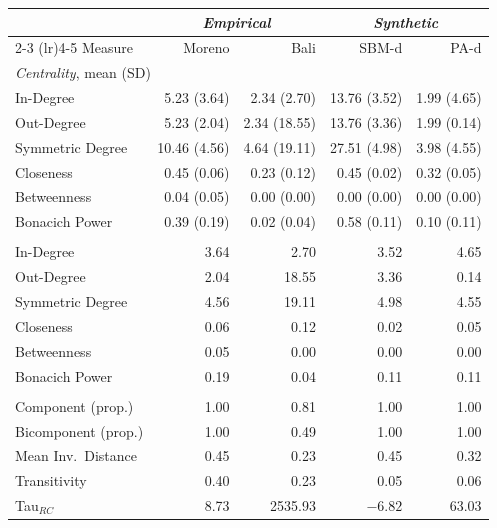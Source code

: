 \documentclass[11pt]{article}
\begin{document}
\begin{table}[!htbp]
\centering
\footnotesize
\setlength{\tabcolsep}{4pt}
\begin{tabular}{l r r | r r}
\toprule
& \multicolumn{2}{c|}{\textit{Empirical}} & \multicolumn{2}{c}{\textit{Synthetic}} \\
\cmidrule(lr){2-3} \cmidrule(lr){4-5}
Measure & Moreno & Bali & SBM-d & PA-d \\
\midrule
\multicolumn{5}{l}{\textit{Centrality}, mean (SD)} \\
In-Degree        & 5.23 (3.64)  & 2.34 (2.70)  & 13.76 (3.52) & 1.99 (4.65) \\
Out-Degree       & 5.23 (2.04)  & 2.34 (18.55) & 13.76 (3.36) & 1.99 (0.14) \\
Symmetric Degree & 10.46 (4.56) & 4.64 (19.11) & 27.51 (4.98) & 3.98 (4.55) \\
Closeness        & 0.45 (0.06)  & 0.23 (0.12)  & 0.45 (0.02)  & 0.32 (0.05) \\
Betweenness      & 0.04 (0.05)  & 0.00 (0.00)  & 0.00 (0.00)  & 0.00 (0.00) \\
Bonacich Power   & 0.39 (0.19)  & 0.02 (0.04)  & 0.58 (0.11)  & 0.10 (0.11) \\
\addlinespace
\multicolumn{5}{l}{\textit{Centralization} (SD of node scores)} \\
In-Degree        & 3.64 & 2.70  & 3.52 & 4.65 \\
Out-Degree       & 2.04 & 18.55 & 3.36 & 0.14 \\
Symmetric Degree & 4.56 & 19.11 & 4.98 & 4.55 \\
Closeness        & 0.06 & 0.12  & 0.02 & 0.05 \\
Betweenness      & 0.05 & 0.00  & 0.00 & 0.00 \\
Bonacich Power   & 0.19 & 0.04  & 0.11 & 0.11 \\
\addlinespace
\multicolumn{5}{l}{\textit{Topology}} \\
Component (prop.)   & 1.00 & 0.81    & 1.00    & 1.00  \\
Bicomponent (prop.) & 1.00 & 0.49    & 1.00    & 1.00  \\
Mean Inv.\ Distance & 0.45 & 0.23    & 0.45    & 0.32  \\
Transitivity        & 0.40 & 0.23    & 0.05    & 0.06  \\
Tau$_{RC}$          & 8.73 & 2535.93 & $-6.82$ & 63.03 \\
\bottomrule
\end{tabular}

\end{table}
\end{document}
